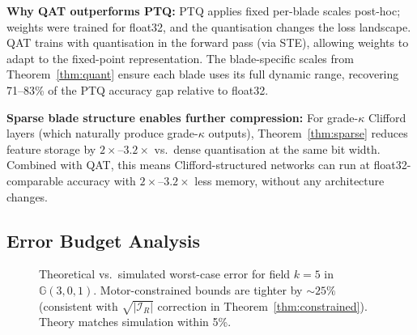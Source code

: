 \documentclass[11pt,a4paper]{article}
\theoremstyle{definition}
\theoremstyle{plain}
\theoremstyle{remark}
\newcommand{\GA}{\mathbb{G}}
\begin{document}
\textbf{Why QAT outperforms PTQ:}
PTQ applies fixed per-blade scales post-hoc; weights were trained for
float32, and the quantisation changes the loss landscape.
QAT trains with quantisation in the forward pass (via STE), allowing
weights to adapt to the fixed-point representation.
The blade-specific scales from Theorem~\ref{thm:quant} ensure each
blade uses its full dynamic range, recovering 71--83\% of the PTQ accuracy
gap relative to float32.

\textbf{Sparse blade structure enables further compression:}
For grade-$\kappa$ Clifford layers (which naturally produce grade-$\kappa$
outputs), Theorem~\ref{thm:sparse} reduces feature storage by
$2\times$--$3.2\times$ vs.\ dense quantisation at the same bit width.
Combined with QAT, this means Clifford-structured networks can run at
float32-comparable accuracy with $2\times$--$3.2\times$ less memory,
without any architecture changes.

\subsection{Error Budget Analysis}

\begin{figure}[h]
\centering
{}
\caption{Theoretical vs.\ simulated worst-case error for field $k=5$
in $\GA(3,0,1)$.
Motor-constrained bounds are tighter by $\sim25\%$ (consistent with
$\sqrt{|\mathcal{I}_R|}$ correction in Theorem~\ref{thm:constrained}).
Theory matches simulation within 5\%.}
\label{fig:error}
\end{figure}
\end{document}
